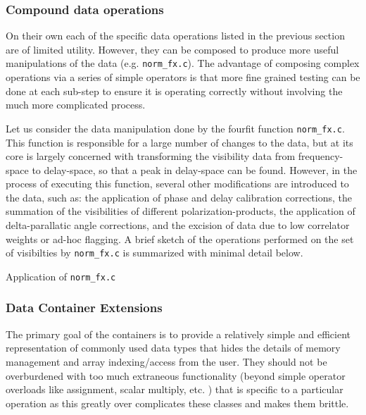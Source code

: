 \subsubsection{Compound data operations}

On their own each of the specific data operations listed in the previous section are of limited utility. However, they can be composed to produce more useful manipulations of the data (e.g. \texttt{norm_fx.c}). The advantage of composing complex operations via a series of simple operators is that more fine grained testing can be done at each sub-step to ensure it is operating correctly without involving the much more complicated process.

Let us consider the data manipulation done by the fourfit function \texttt{norm_fx.c}. This function is responsible for a large number of changes to the data, but at its core is largely concerned with transforming the visibility data from frequency-space to delay-space, so that a peak in delay-space can be found. However, in the process of executing this function, several other modifications are introduced to the data, such as: the application of phase and delay calibration corrections, the summation of the visibilities of different polarization-products, the application of delta-parallatic angle corrections, and the excision of data due to low correlator weights or ad-hoc flagging. A brief sketch of the operations performed on the set of visibilties by \texttt{norm_fx.c} is summarized with minimal detail below.


\begin{algorithm}[h!]
  \caption{Application of \texttt{norm_fx.c}}
    \begin{algorithmic}[1]
	\State { }
    \State { }
    \end{algorithmic}
  \label{algo:cyclic-rot}
\end{algorithm}





\subsubsection{Data Container Extensions}

The primary goal of the containers is to provide a relatively simple and efficient representation of commonly used data types that hides the details of memory management and array indexing/access from the user. They should not be overburdened with too much extraneous functionality (beyond simple operator overloads like assignment, scalar multiply, etc. ) that is specific to a particular operation as this greatly
over complicates these classes and makes them brittle. 

